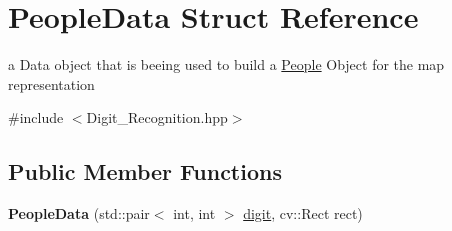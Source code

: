 \hypertarget{struct_people_data}{}\section{People\+Data Struct Reference}
\label{struct_people_data}


a Data object that is beeing used to build a \mbox{\hyperlink{class_people}{People}} Object for the map representation  




{\ttfamily \#include $<$Digit\+\_\+\+Recognition.\+hpp$>$}

\subsection*{Public Member Functions}
\begin{DoxyCompactItemize}
\item 
\mbox{\label{struct_people_data_a4e3ff825d34cb3c6f195d3db1f7b7fbc}} 
{\bfseries People\+Data} (std\+::pair$<$ int, int $>$ \mbox{\hyperlink{struct_people_data_ac67414ff2db4d485a431b7a93cc02298}{digit}}, cv\+::\+Rect rect)
\end{DoxyCompactItemize}
